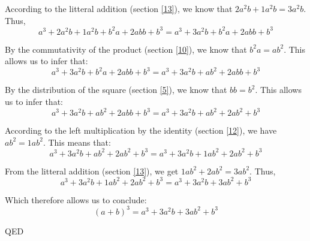 \documentclass[a4paper]{article}
\begin{document}
According to the litteral addition (section \ref{13}), we know that $2a^2b+1a^2b=3a^2b$. Thus,
\[a^3+2a^2b+1a^2b+b^2a+2abb+b^3=a^3+3a^2b+b^2a+2abb+b^3\]

By the commutativity of the product (section \ref{10}), we know that $b^2a=ab^2$. This allows us to infer that:
\[a^3+3a^2b+b^2a+2abb+b^3=a^3+3a^2b+ab^2+2abb+b^3\]

By the distribution of the square (section \ref{5}), we know that $bb=b^2$. This allows us to infer that:
\[a^3+3a^2b+ab^2+2abb+b^3=a^3+3a^2b+ab^2+2ab^2+b^3\]

According to the left multiplication by the identity (section \ref{12}), we have $ab^2=1ab^2$. This means that:
\[a^3+3a^2b+ab^2+2ab^2+b^3=a^3+3a^2b+1ab^2+2ab^2+b^3\]

From the litteral addition (section \ref{13}), we get $1ab^2+2ab^2=3ab^2$. Thus,
\[a^3+3a^2b+1ab^2+2ab^2+b^3=a^3+3a^2b+3ab^2+b^3\]

Which therefore allows us to conclude:
\[\left(a+b\right)^3 = a^3+3a^2b+3ab^2+b^3\]
\begin{flushright}
QED
\end{flushright}
\end{document}
